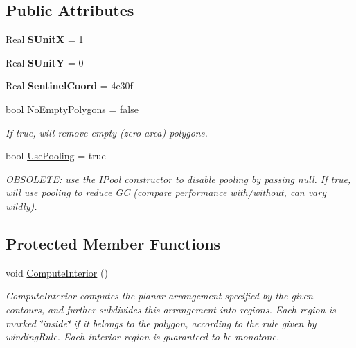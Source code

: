 \subsection*{Public Attributes}
\begin{DoxyCompactItemize}
\item 
\mbox{\label{class_super_tiled2_unity_1_1_editor_1_1_lib_tess_dot_net_1_1_tess_ac8385432178c9ce4f2e3468fb9e8973a}} 
Real {\bfseries S\+UnitX} = 1
\item 
\mbox{\label{class_super_tiled2_unity_1_1_editor_1_1_lib_tess_dot_net_1_1_tess_a5c7282700d2a992da43768ece7b4c5ec}} 
Real {\bfseries S\+UnitY} = 0
\item 
\mbox{\label{class_super_tiled2_unity_1_1_editor_1_1_lib_tess_dot_net_1_1_tess_ab46494df50424ec37ef8e48fb39cb4c0}} 
Real {\bfseries Sentinel\+Coord} = 4e30f
\item 
bool \mbox{\hyperlink{class_super_tiled2_unity_1_1_editor_1_1_lib_tess_dot_net_1_1_tess_a1b947d7d13dfc58a8848e4c8420ab62d}{No\+Empty\+Polygons}} = false
\begin{DoxyCompactList}\small\item\em If true, will remove empty (zero area) polygons. \end{DoxyCompactList}\item 
bool \mbox{\hyperlink{class_super_tiled2_unity_1_1_editor_1_1_lib_tess_dot_net_1_1_tess_ae1a04c8eb8585a734a74f6c00b7e2e20}{Use\+Pooling}} = true
\begin{DoxyCompactList}\small\item\em O\+B\+S\+O\+L\+E\+TE\+: use the \mbox{\hyperlink{class_super_tiled2_unity_1_1_editor_1_1_lib_tess_dot_net_1_1_i_pool}{I\+Pool}} constructor to disable pooling by passing null. If true, will use pooling to reduce GC (compare performance with/without, can vary wildly). \end{DoxyCompactList}\end{DoxyCompactItemize}
\subsection*{Protected Member Functions}
\begin{DoxyCompactItemize}
\item 
void \mbox{\hyperlink{class_super_tiled2_unity_1_1_editor_1_1_lib_tess_dot_net_1_1_tess_a106a0e9131ed76adbf04e70ec0fc728f}{Compute\+Interior}} ()
\begin{DoxyCompactList}\small\item\em Compute\+Interior computes the planar arrangement specified by the given contours, and further subdivides this arrangement into regions. Each region is marked \char`\"{}inside\char`\"{} if it belongs to the polygon, according to the rule given by winding\+Rule. Each interior region is guaranteed to be monotone. \end{DoxyCompactList}\end{DoxyCompactItemize}
